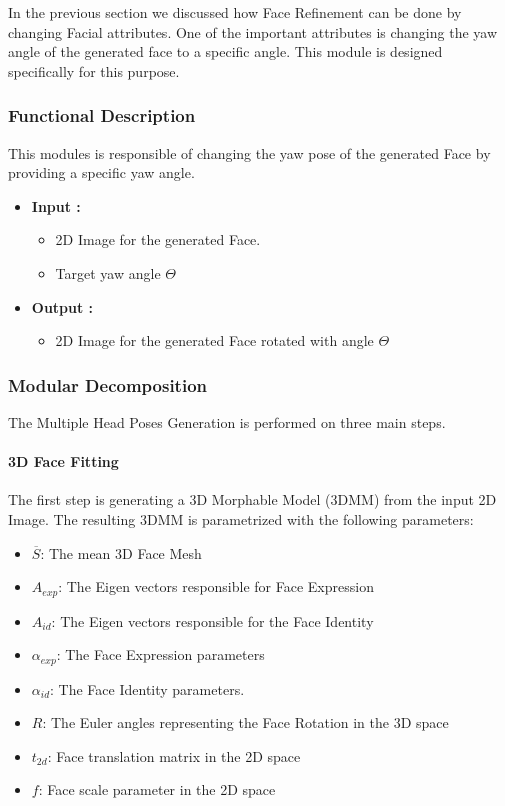 In the previous section we discussed how Face Refinement can be done by changing Facial attributes. One of the important attributes is changing the yaw angle of the generated face to a specific angle. This module is designed specifically for this purpose.

\subsubsection{Functional Description}
This modules is responsible of changing the yaw pose of the generated Face by providing a specific yaw angle.

\begin{itemize}
    \item \textbf{Input :}
    \begin{itemize}
        \item 2D Image for the generated Face.
        \item Target yaw angle $\Theta$

    \end{itemize}
    \item \textbf{Output :}
    \begin{itemize}
        \item 2D Image for the generated Face rotated with angle $\Theta$
    \end{itemize}
\end{itemize}
\subsubsection{Modular Decomposition}

The Multiple Head Poses Generation is performed on three main steps.

\paragraph{3D Face Fitting}
The first step is generating a 3D Morphable Model (3DMM) from the input 2D Image. The resulting 3DMM is parametrized with the following parameters:

\begin{itemize}
    \item $\overline{S}$: The mean 3D Face Mesh 
    \item $A _{exp}$: The Eigen vectors responsible for Face Expression
    \item $A _{id}$: The Eigen vectors responsible for the Face Identity
    \item $\alpha _{exp}$: The Face Expression parameters
    \item $\alpha _{id}$: The Face Identity parameters.
    \item $R$: The Euler angles representing the Face Rotation in the 3D space
    \item $t _{2d}$: Face translation matrix in the 2D space
    \item $f$: Face scale parameter in the 2D space
\end{itemize}

